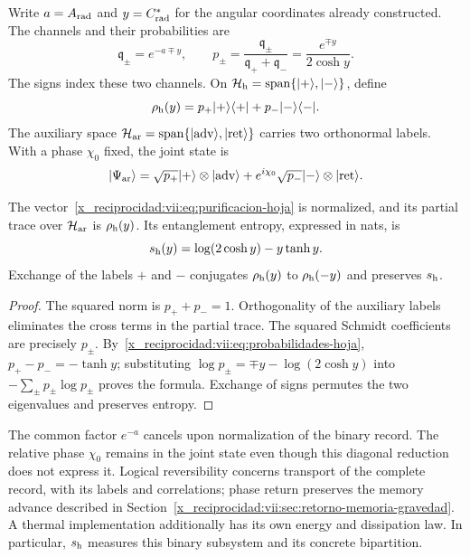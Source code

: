 Write \(a=A_{\rm rad}\) and \(y=C^*_{\rm rad}\) for the
angular coordinates already constructed. The channels and their probabilities are
\begin{equation}
 \mathfrak q_\pm=e^{-a\mp y},\qquad
 p_\pm=\frac{\mathfrak q_\pm}{\mathfrak q_++\mathfrak q_-}
       =\frac{e^{\mp y}}{2\cosh y}.
 \label{x_reciprocidad:vii:eq:probabilidades-hoja}
\end{equation}
The signs index these two channels. On
\(\mathcal H_{\rm h}=\operatorname{span}\{|+\rangle,|-\rangle\}\),
define
\[
 \rho_{\rm h}(y)=p_+|+\rangle\langle+|+p_-|-\rangle\langle-|.
\]
The auxiliary space
\(\mathcal H_{\rm ar}=\operatorname{span}
\{|\mathrm{adv}\rangle,|\mathrm{ret}\rangle\}\)
carries two orthonormal labels. With a phase \(\chi_0\) fixed, the joint
state is
\begin{equation}
 |\Psi_{\rm ar}\rangle
 =\sqrt{p_+}|+\rangle\otimes|\mathrm{adv}\rangle
  +e^{i\chi_0}\sqrt{p_-}|-\rangle\otimes|\mathrm{ret}\rangle.
 \label{x_reciprocidad:vii:eq:purificacion-hoja}
\end{equation}

\begin{proposition}
\label{x_reciprocidad:vii:prop:purificacion-hoja}
The vector~\eqref{x_reciprocidad:vii:eq:purificacion-hoja} is normalized, and its partial
trace over \(\mathcal H_{\rm ar}\) is \(\rho_{\rm h}(y)\).
Its entanglement entropy, expressed in nats, is
\begin{equation}
 s_{\rm h}(y)=\log(2\cosh y)-y\tanh y.
 \label{x_reciprocidad:vii:eq:entropia-hoja}
\end{equation}
Exchange of the labels \(+\) and \(-\) conjugates
\(\rho_{\rm h}(y)\) to \(\rho_{\rm h}(-y)\) and preserves
\(s_{\rm h}\).
\end{proposition}
\begin{proof}
The squared norm is \(p_++p_-=1\). Orthogonality of the
auxiliary labels eliminates the cross terms in the partial trace.
The squared Schmidt coefficients are precisely \(p_\pm\).
By~\eqref{x_reciprocidad:vii:eq:probabilidades-hoja},
\(p_+-p_-=-\tanh y\); substituting
\(\log p_\pm=\mp y-\log(2\cosh y)\) into
\(-\sum_\pm p_\pm\log p_\pm\) proves the formula.
Exchange of signs permutes the two eigenvalues and preserves entropy.
\end{proof}

The common factor \(e^{-a}\) cancels upon normalization of the binary record.
The relative phase \(\chi_0\) remains in the joint state even though this
diagonal reduction does not express it. Logical reversibility concerns
transport of the complete record, with its labels and correlations;
phase return preserves the memory advance described in
Section~\ref{x_reciprocidad:vii:sec:retorno-memoria-gravedad}. A thermal implementation
additionally has its own energy and dissipation law. In particular,
\(s_{\rm h}\) measures this binary subsystem and its concrete bipartition.

